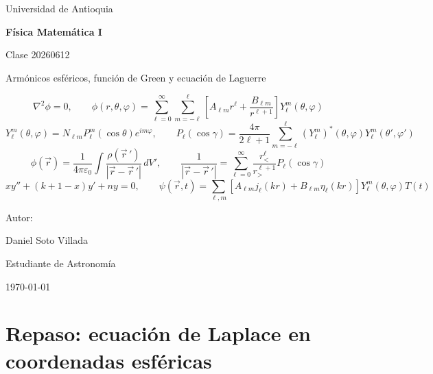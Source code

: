 \documentclass[a4paper]{article}
\begin{document}

\begin{titlepage}
  \thispagestyle{empty}
  \centering
  {\Large Universidad de Antioquia\par}
  \vspace{2cm}
  {\huge\bfseries Física Matemática I\par}
  \vspace{0.4cm}
  {\Large Clase 20260612\par}
  \vspace{0.8cm}
  {\large Armónicos esféricos, función de Green y ecuación de Laguerre\par}
  \vspace{1.0cm}
  \begin{tcolorbox}[
    colback=blue!3,
    colframe=blue!45!black,
    width=0.88\textwidth,
    arc=2mm,
    boxrule=0.7pt,
    title={Ecuaciones principales},
    fonttitle=\bfseries,
    halign=center
  ]
  $$
  \nabla^2\phi=0,
  \qquad
  \phi(r,\theta,\varphi)=\sum_{\ell=0}^{\infty}\sum_{m=-\ell}^{\ell}\left[A_{\ell m}r^\ell+\frac{B_{\ell m}}{r^{\ell+1}}\right]Y_\ell^m(\theta,\varphi)
  $$
  $$
  Y_\ell^m(\theta,\varphi)=N_{\ell m}P_\ell^m(\cos\theta)e^{im\varphi},
  \qquad
  P_\ell(\cos\gamma)=\frac{4\pi}{2\ell+1}\sum_{m=-\ell}^{\ell}(Y_\ell^m)^*(\theta,\varphi)Y_\ell^m(\theta',\varphi')
  $$
  $$
  \phi(\vec r)=\frac{1}{4\pi\varepsilon_0}\int\frac{\rho(\vec r\,')}{|\vec r-\vec r\,'|}\,dV',
  \qquad
  \frac{1}{|\vec r-\vec r\,'|}=\sum_{\ell=0}^{\infty}\frac{r_<^\ell}{r_>^{\ell+1}}P_\ell(\cos\gamma)
  $$
  $$
  x y''+(k+1-x)y'+ny=0,
  \qquad
  \psi(\vec r,t)=\sum_{\ell,m}\left[A_{\ell m}j_\ell(kr)+B_{\ell m}\eta_\ell(kr)\right]Y_\ell^m(\theta,\varphi)T(t)
  $$
  \end{tcolorbox}
  \vspace{0.9cm}
  {\large Autor:\par}
  \vspace{0.2cm}
  {\large Daniel Soto Villada\par}
  {\large Estudiante de Astronomía\par}
  \vfill
  {\large \today\par}
\end{titlepage}

\setcounter{page}{1}
\newpage
\tableofcontents
\newpage
{}


\section{Repaso: ecuación de Laplace en coordenadas esféricas}
\end{document}
